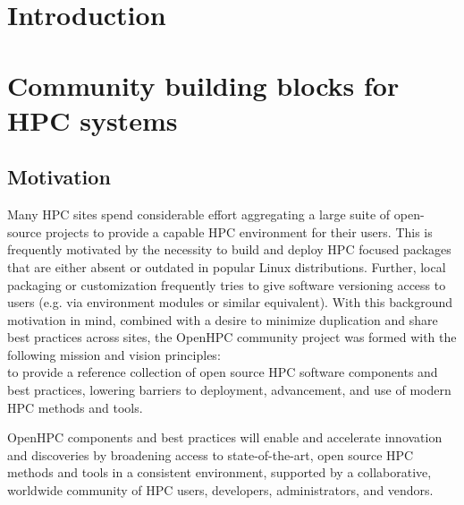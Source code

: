 \documentclass{sig-alternate-05-2015}
\begin{document}
%
%

%
%
\printccsdesc


\section{Introduction}


\section{Community building blocks for HPC systems}

\subsection{Motivation}
Many HPC sites spend considerable effort aggregating a large suite of
open-source projects to provide a capable HPC environment for their users.
This is frequently motivated by the necessity to build and deploy HPC focused
packages that are either absent or outdated in popular Linux
distributions. Further, local packaging or customization frequently tries to
give software versioning access to users (e.g. via environment modules or
similar equivalent).  With this background motivation in mind, combined with a
desire to minimize duplication and share best practices across sites, the OpenHPC community
project was formed with the following mission and vision principles: \\

 to 
provide a reference collection of open source HPC software components and
best practices, lowering barriers to deployment, advancement, and use of
modern HPC methods and tools.

 OpenHPC components and best practices will enable and
accelerate innovation and discoveries by broadening access to state-of-the-art,
open source HPC methods and tools in a consistent environment, supported by a
collaborative, worldwide community of HPC users, developers, administrators,
and vendors. \\

\end{document}
